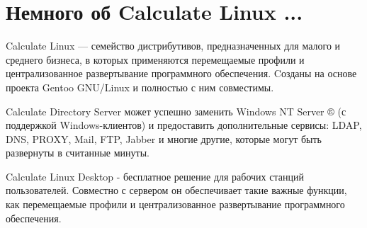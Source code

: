 \newpage
\section{Немного об Calculate Linux ...}

Calculate Linux — семейство дистрибутивов, предназначенных для малого и среднего бизнеса, в которых применяются перемещаемые профили и централизованное развертывание программного обеспечения. Cозданы на основе проекта Gentoo GNU/Linux и полностью с ним совместимы.

Calculate Directory Server может успешно заменить Windows NT Server ® (с поддержкой Windows-клиентов) и предоставить дополнительные сервисы: LDAP, DNS, PROXY, Mail, FTP, Jabber и многие другие, которые могут быть развернуты в считанные минуты.

Calculate Linux Desktop - бесплатное решение для рабочих станций пользователей. Совместно с сервером он обеспечивает такие важные функции, как перемещаемые профили и централизованное развертывание программного обеспечения.
